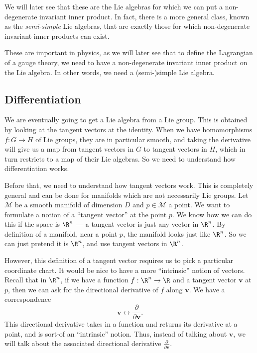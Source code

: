 \documentclass[a4paper]{article}
\begin{document}
We will later see that these are the Lie algebras for which we can put a non-degenerate invariant inner product. In fact, there is a more general class, known as the \emph{semi-simple} Lie algebras, that are exactly those for which non-degenerate invariant inner products can exist.

These are important in physics, as we will later see that to define the Lagrangian of a gauge theory, we need to have a non-degenerate invariant inner product on the Lie algebra. In other words, we need a (semi-)simple Lie algebra.


\subsection{Differentiation}
We are eventually going to get a Lie algebra from a Lie group. This is obtained by looking at the tangent vectors at the identity. When we have homomorphisms $f: G \to H$ of Lie groups, they are in particular smooth, and taking the derivative will give us a map from tangent vectors in $G$ to tangent vectors in $H$, which in turn restricts to a map of their Lie algebras. So we need to understand how differentiation works.

Before that, we need to understand how tangent vectors work. This is completely general and can be done for manifolds which are not necessarily Lie groups. Let $\mathcal{M}$ be a smooth manifold of dimension $D$ and $p \in \mathcal{M}$ a point. We want to formulate a notion of a ``tangent vector'' at the point $p$. We know how we can do this if the space is $\R^n$ --- a tangent vector is just any vector in $\R^n$. By definition of a manifold, near a point $p$, the manifold looks just like $\R^n$. So we can just pretend it is $\R^n$, and use tangent vectors in $\R^n$.

However, this definition of a tangent vector requires us to pick a particular coordinate chart. It would be nice to have a more ``intrinsic'' notion of vectors. Recall that in $\R^n$, if we have a function $f: \R^n \to \R$ and a tangent vector $\mathbf{v}$ at $p$, then we can ask for the directional derivative of $f$ along $\mathbf{v}$. We have a correspondence
\[
  \mathbf{v} \longleftrightarrow \frac{\partial}{\partial \mathbf{v}}.
\]
This directional derivative takes in a function and returns its derivative at a point, and is sort-of an ``intrinsic'' notion. Thus, instead of talking about $\mathbf{v}$, we will talk about the associated directional derivative $\frac{\partial}{\partial \mathbf{v}}$.
\end{document}
